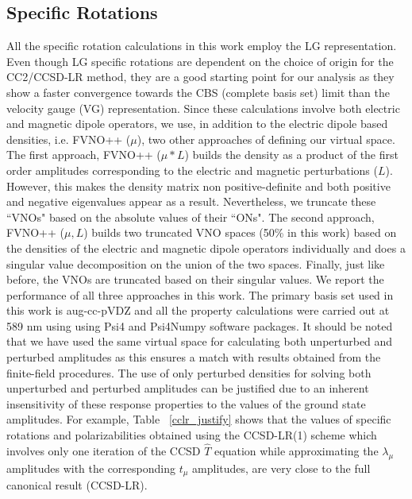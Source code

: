 \subsection{Specific Rotations}

All the specific rotation calculations in this work employ the LG representation.
Even though LG specific rotations are dependent on the choice of origin for the CC2/CCSD-LR method, they are a good starting point for our analysis as they show a faster convergence towards the CBS (complete basis set) limit than the velocity gauge (VG) representation. Since these calculations involve both electric and magnetic dipole operators, we use, in addition to the electric dipole based densities, i.e. FVNO++ ($\mu$), two other approaches of defining our virtual space. The first approach, FVNO++ ($\mu*L$) builds the density as a product of the first order amplitudes corresponding to the electric and magnetic perturbations ($L$). However, this makes the density matrix non positive-definite and both positive and negative eigenvalues appear as a result. Nevertheless, we truncate these ``VNOs" based on the absolute values of their ``ONs". The second approach, FVNO++ ($\mu,L$) builds two truncated VNO spaces (50\% in this work) based on the densities of the electric and magnetic dipole operators individually and does a singular value decomposition on the union of the two spaces. Finally, just like before, the VNOs are truncated based on their singular values. We report the performance of all three approaches in this work. The primary basis set used in this work is aug-cc-pVDZ\cite{Dunning89,Kendall92,Woon94} and all the property calculations were carried out at 589 nm using using Psi4 and Psi4Numpy software packages\cite{Parrish17, Smith18}.
It should be noted that we have used the same virtual space for calculating both unperturbed and perturbed amplitudes as this ensures a match with results obtained from the finite-field procedures. The use of only perturbed densities for solving both unperturbed and perturbed amplitudes can be justified due to an inherent insensitivity of these response properties to the values of the ground state amplitudes. For example, Table ~\ref{cclr_justify} shows that the values of specific rotations and polarizabilities obtained using the CCSD-LR(1) scheme which involves only one iteration of the CCSD $\hat{T}$ equation while approximating the $\lambda_\mu$ amplitudes with the corresponding $t_\mu$ amplitudes, are very close to the full canonical result (CCSD-LR).
